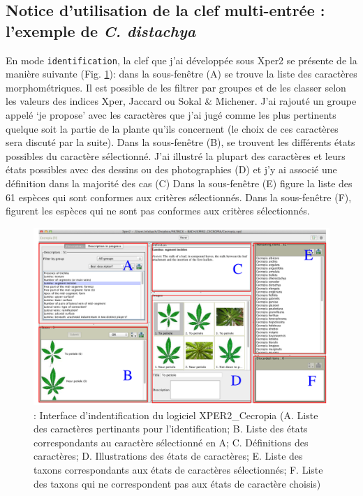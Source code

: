 \documentclass[a4paper]{article}
\theoremstyle{definition}
\theoremstyle{definition}
\theoremstyle{definition}
\theoremstyle{remark}
\begin{document}
\subsection{\texorpdfstring{Notice d'utilisation de la clef multi-entrée
: l'exemple de \emph{C.
distachya}}{Notice d'utilisation de la clef multi-entrée : l'exemple de C. distachya}}\label{notice-dutilisation-de-la-clef-multi-entree-lexemple-de-c.-distachya}

En mode \texttt{identification}, la clef que j'ai développée sous Xper2
se présente de la manière suivante (Fig. \ref{fig:fig5}): dans la
sous-fenêtre (A) se trouve la liste des caractères morphométriques. Il
est possible de les filtrer par groupes et de les classer selon les
valeurs des indices Xper, Jaccard ou Sokal \& Michener. J'ai rajouté un
groupe appelé `je propose' avec les caractères que j'ai jugé comme les
plus pertinents quelque soit la partie de la plante qu'ils concernent
(le choix de ces caractères sera discuté par la suite). Dans la
sous-fenêtre (B), se trouvent les différents états possibles du
caractère sélectionné. J'ai illustré la plupart des caractères et leurs
états possibles avec des dessins ou des photographies (D) et j'y ai
associé une définition dans la majorité des cas (C) Dans la sous-fenêtre
(E) figure la liste des 61 espèces qui sont conformes aux critères
sélectionnés. Dans la sous-fenêtre (F), figurent les espèces qui ne sont
pas conformes aux critères sélectionnés.








\begin{figure}[H]

{\centering \includegraphics[width=0.9\linewidth]{figure/fig5} 

}

\caption{: Interface d'indentification du logiciel XPER2\_Cecropia (A.
Liste des caractères pertinants pour l'identification; B. Liste des
états correspondants au caractère sélectionné en A; C. Définitions des
caractères; D. Illustrations des états de caractères; E. Liste des
taxons correspondants aux états de caractères sélectionnés; F. Liste des
taxons qui ne correspondent pas aux états de caractère choisis)}\label{fig:fig5}
\end{figure}
\end{document}
